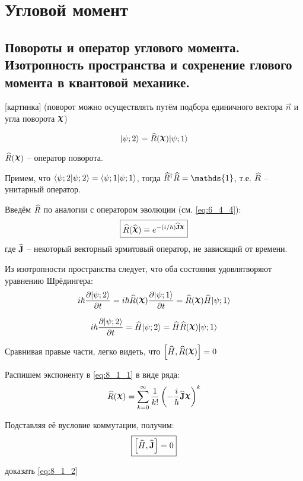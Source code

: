\chapter{Угловой момент}

\section{Повороты и оператор углового момента. Изотропность пространства и сохренение глового момента в квантовой механике.}

[картинка]
(поворот можно осуществлять путём подбора единичного вектора $\vec{n}$ и угла поворота $\rchi$)

$$
\ket{\psi;2} = \op{R}(\vec{\rchi}) \ket{\psi;1}
$$

$\op{R}(\vec{\rchi})$ -- оператор поворота.

Примем, что $\langle{\psi;2}|{\psi;2}\rangle = \langle{\psi;1}|{\psi;1}\rangle$, тогда $\op{R}^\dag \op{R} = \mathds{1}$, т.е. $\widehat{R}$ -- унитарный оператор.

Введём $\widehat{R}$ по аналогии с оператором эволюции (см. \eqref{eq:6_4_4}):
\begin{equation}
\label{eq:8_1_1}
\boxed {
	\op{R}(\op{\rchi}) \equiv e^{-(i/\hbar) \op{\vec{J}} \vec{\rchi}}
}
\end{equation}
где $\widehat{\mathbf{J}}$ -- некоторый векторный эрмитовый оператор, не зависящий от времени.

Из изотропности пространства следует, что оба состояния удовлятворяют уравнению Шрёдингера:
$$
i\hbar \pd{\ket{\psi;2}}{t} = i\hbar \op{R}(\vec{\rchi}) \pd{\ket{\psi;1}}{t} = \op{R}(\vec{\rchi}) \op{H}\ket{\psi;1}
$$

$$
i\hbar \pd{\ket{\psi;2}}{t} = \op{H}\ket{\psi;2} = \op{H} \op{R}(\vec{\rchi}) \ket{\psi;1}
$$

Сравнивая правые части, легко видеть, что $\brs{\op{H}, \op{R}(\vec{\rchi})} = 0$

Распишем экспоненту в \eqref{eq:8_1_1} в виде ряда:
$$
\op{R}(\vec{\rchi}) = \sum_{k=0}^{\infty} \frac{1}{k!} \brc{- \frac{i}{\hbar} \op{\vec{J}} \vec{\rchi}}^k
$$

Подставляя её вусловие коммутации, получим:
\begin{equation}
\label{eq:8_1_2}
\boxed {
	\left [ {\widehat{H}, \widehat{\mathbf{J}}} \right ] = 0
}
\end{equation}

\begin{excr}
доказать \eqref{eq:8_1_2}
\end{excr}

